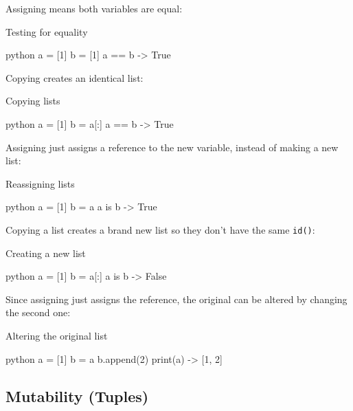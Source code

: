 \noindent
Assigning means both variables are equal:

\begin{highlight}{Testing for equality}
    \begin{code}{python}
        a = [1]
        b = [1]
        a == b -> True
    \end{code}
\end{highlight}

\noindent
Copying creates an identical list:

\begin{highlight}{Copying lists}
    \begin{code}{python}
        a = [1]
        b = a[:]
        a == b -> True
    \end{code}
\end{highlight}

\noindent
Assigning just assigns a reference to the new variable, instead of making a new list:

\begin{highlight}{Reassigning lists}
    \begin{code}{python}
        a = [1]
        b = a
        a is b -> True
    \end{code}
\end{highlight}

\noindent
Copying a list creates a brand new list so they don't have the same \texttt{id()}:

\begin{highlight}{Creating a new list}
    \begin{code}{python}
        a = [1]
        b = a[:]
        a is b -> False
    \end{code}
\end{highlight}

\noindent
Since assigning just assigns the reference, the original can be altered by changing the second one:

\begin{highlight}{Altering the original list}
    \begin{code}{python}
        a = [1]
        b = a
        b.append(2)
        print(a) -> [1, 2]
    \end{code}
\end{highlight}

\subsection{Mutability (Tuples)}\label{sub:mutability_tuples_}

